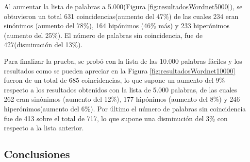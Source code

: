 
Al aumentar la lista de palabras a 5.000(Figura \ref{fig:resultadosWordnet5000}), se obtuvieron un total 631 coincidencias(aumento del 47\%) de las cuales 234 eran sinónimos (aumento del 78\%), 164 hipónimos (46\% más) y 233 hiperónimos (aumento del 25\%). El número de palabras sin coincidencia, fue de 427(disminución del 13\%).


Para finalizar la prueba, se probó con la lista de las 10.000 palabras fáciles y los resultados como se pueden apreciar en la Figura \ref{fig:resultadosWordnet10000} fueron de un total de 685 coincidencias, lo que supone un aumento del 9\% respecto a los resultados obtenidos con la lista de 5.000 palabras, de las cuales 262 eran sinónimos (aumento del 12\%), 177 hipónimos (aumento del 8\%) y 246 hiperónimos(aumento del 6\%). Por último el número de palabras sin coincidencia fue de 413 sobre el total de 717, lo que supone una disminución del 3\% con respecto a la lista anterior.


\subsection{Conclusiones}
\label{cap:subsec:conclusionesPruebas}